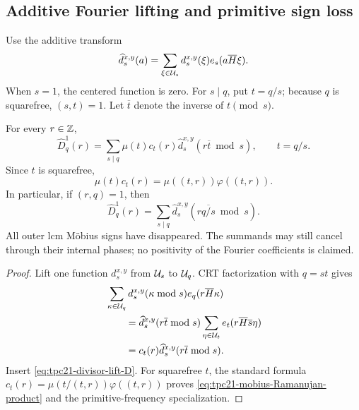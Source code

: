 \subsection{Additive Fourier lifting and primitive sign loss}

Use the additive transform
\begin{equation}
 \widehat d_s^{x,y}(a)
 =\sum_{\xi\in\mathcal U_s}d_s^{x,y}(\xi)
 e_s(a\overline H\xi).
 \label{eq:tpc21-ds-additive-transform}
\end{equation}
When \(s=1\), the centered function is zero.  For \(s\mid q\), put
\(t=q/s\); because \(q\) is squarefree, \((s,t)=1\).  Let
\(\overline t\) denote the inverse of \(t\pmod s\).

\begin{theorem}
\label{thm:tpc21-additive-divisor-lift}
For every \(r\in\mathbb Z\),
\begin{equation}
 \boxed{
 \widehat D_q^{1}(r)
 =\sum_{s\mid q}\mu(t)c_t(r)
 \widehat d_s^{x,y}(r\overline t\bmod s),
 \qquad t=q/s.}
 \label{eq:tpc21-additive-divisor-lift}
\end{equation}
Since \(t\) is squarefree,
\begin{equation}
 \mu(t)c_t(r)
 =\mu((t,r))\varphi((t,r)).
 \label{eq:tpc21-mobius-Ramanujan-product}
\end{equation}
In particular, if \((r,q)=1\), then
\begin{equation}
 \boxed{
 \widehat D_q^{1}(r)
 =\sum_{s\mid q}
 \widehat d_s^{x,y}(r\overline{q/s}\bmod s).}
 \label{eq:tpc21-primitive-frequency-sign-loss}
\end{equation}
All outer lcm M\"obius signs have disappeared.  The summands may still
cancel through their internal phases; no positivity of the Fourier
coefficients is claimed.
\end{theorem}

\begin{proof}
Lift one function \(d_s^{x,y}\) from \(\mathcal U_s\) to \(\mathcal U_q\).  CRT
factorization with \(q=st\) gives
\begin{align*}
 &\sum_{\kappa\in\mathcal U_q}d_s^{x,y}(\kappa\bmod s)
 e_q(r\overline H\kappa)\\
 &\qquad=
 \widehat d_s^{x,y}(r\overline t\bmod s)
 \sum_{\eta\in\mathcal U_t}e_t(r\overline H\overline s\eta)\\
 &\qquad=
 c_t(r)\widehat d_s^{x,y}(r\overline t\bmod s).
\end{align*}
Insert \eqref{eq:tpc21-divisor-lift-D}.  For squarefree \(t\), the
standard formula
\(c_t(r)=\mu(t/(t,r))\varphi((t,r))\) proves
\eqref{eq:tpc21-mobius-Ramanujan-product} and the primitive-frequency
specialization.
\end{proof}

